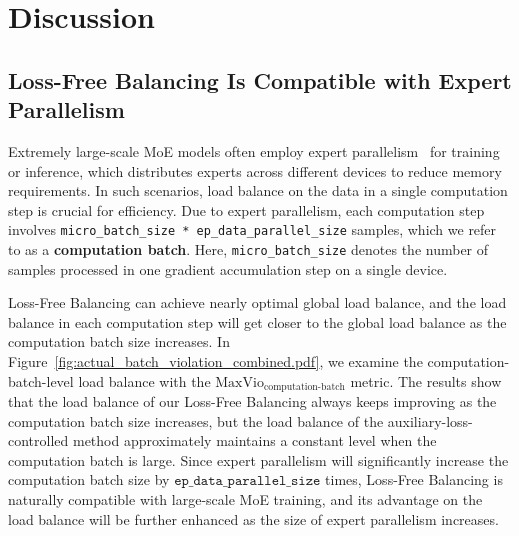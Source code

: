\documentclass{article} %
\newcommand{\ours}{Loss-Free Balancing}
\newcommand{\Ours}{Loss-Free Balancing}
\newcommand{\OURS}{Loss-Free Balancing}
\begin{document}
\section{Discussion}
\subsection{\OURS{} Is Compatible with Expert Parallelism}
\label{subsec:load_balance_micro_batch}
Extremely large-scale MoE models often employ expert parallelism~\citep{Lepikhin2020GShardSG} for training or inference, which distributes experts across different devices to reduce memory requirements. 
In such scenarios, load balance on the data in a single computation step is crucial for efficiency. 
Due to expert parallelism, each computation step involves \texttt{micro\_batch\_size * ep\_data\_parallel\_size} samples, which we refer to as a \textbf{computation batch}. 
Here, \texttt{micro\_batch\_size} denotes the number of samples processed in one gradient accumulation step on a single device.

\Ours{} can achieve nearly optimal global load balance, and the load balance in each computation step will get closer to the global load balance as the computation batch size increases. 
In Figure~\ref{fig:actual_batch_violation_combined.pdf}, we examine the computation-batch-level load balance with the $\text{MaxVio}_\text{computation-batch}$ metric. 
The results show that the load balance of our \ours{} always keeps improving as the computation batch size increases, but the load balance of the auxiliary-loss-controlled method approximately maintains a constant level when the computation batch is large.
Since expert parallelism will significantly increase the computation batch size by $\texttt{ep\_data\_parallel\_size}$ times, \ours{} is naturally compatible with large-scale MoE training, and its advantage on the load balance will be further enhanced as the size of expert parallelism increases.
\end{document}
